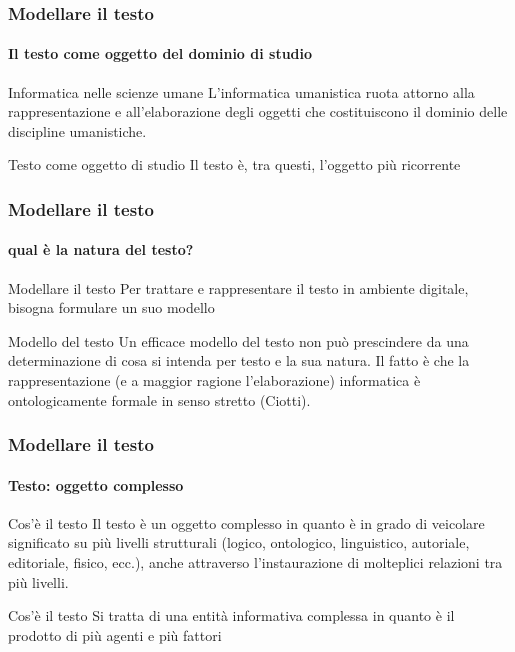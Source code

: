 
\begin{frame}
	\frametitle{Modellare il testo}
	\framesubtitle{Il testo come oggetto del dominio di studio}
	\addtocounter{nframe}{1}

	\begin{block}{Informatica nelle scienze umane}
		L'informatica umanistica ruota attorno alla rappresentazione e all'elaborazione degli oggetti che costituiscono il dominio delle discipline umanistiche.
	\end{block}

	\begin{block}{Testo come oggetto di studio}
		Il testo è, tra questi, l'oggetto più ricorrente
	\end{block}

\end{frame}

\begin{frame}
	\frametitle{Modellare il testo}
	\framesubtitle{qual è la natura del testo?}
	\addtocounter{nframe}{1}

	\begin{block}{Modellare il testo}
		Per trattare e rappresentare il testo in ambiente digitale, bisogna formulare un suo modello
	\end{block}

	\begin{block}{Modello del testo}
		Un efficace modello del testo non può prescindere da una determinazione di cosa si intenda per testo e la sua natura. Il fatto è che la rappresentazione (e a maggior ragione l’elaborazione) informatica è ontologicamente formale in senso stretto (Ciotti).
	\end{block}

\end{frame}

\begin{frame}
	\frametitle{Modellare il testo}
	\framesubtitle{Testo: oggetto complesso}
	\addtocounter{nframe}{1}

	\begin{block}{Cos'è il testo}
		Il testo è un oggetto complesso in quanto è in grado di veicolare significato su più livelli strutturali (logico, ontologico, linguistico, autoriale, editoriale, fisico, ecc.), anche attraverso l’instaurazione di molteplici relazioni tra più livelli.
	\end{block}

	\begin{block}{Cos'è il testo}
		Si tratta di una entità informativa complessa in quanto è il prodotto di più agenti e più fattori
	\end{block}

\end{frame}

